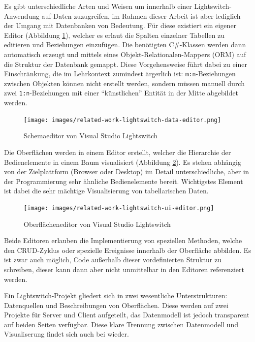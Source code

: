 Es gibt unterschiedliche Arten und Weisen um innerhalb einer Lightswitch-Anwendung auf Daten zuzugreifen, im Rahmen dieser Arbeit ist aber lediglich der Umgang mit Datenbanken von Bedeutung. Für diese existiert ein eigener Editor (Abbildung \ref{fig:lightswitch-data-designer}), welcher es erlaut die Spalten einzelner Tabellen zu editieren und Beziehungen einzufügen. Die benötigten C\#-Klassen werden dann automatisch erzeugt und mittels eines Objekt-Relationalen-Mappers (ORM) auf die Struktur der Datenbank gemappt. Diese Vorgehensweise führt dabei zu einer Einschränkung, die im Lehrkontext zumindest ärgerlich ist: \lstinline{m:n}-Beziehungen zwischen Objekten können nicht erstellt werden, sondern müssen manuell durch zwei \lstinline{1:n}-Beziehungen mit einer "`künstlichen"' Entität in der Mitte abgebildet werden.

\begin{figure}[h]
  \centering \texttt{[image: images/related-work-lightswitch-data-editor.png]}
  \caption{Schemaeditor von Visual Studio Lightswitch}
  \label{fig:lightswitch-data-designer}
\end{figure}

Die Oberflächen werden in einem Editor erstellt, welcher die Hierarchie der Bedienelemente in einem Baum visualisiert (Abbildung \ref{fig:lightswitch-ui-designer}). Es stehen abhängig von der Zielplattform (Browser oder Desktop) im Detail unterschiedliche, aber in der Programmierung sehr ähnliche Bedienelemente bereit. Wichtigstes Element ist dabei die sehr mächtige Visualisierung von tabellarischen Daten.

\begin{figure}[h]
  \centering \texttt{[image: images/related-work-lightswitch-ui-editor.png]}
  \caption{Oberflächeneditor von Visual Studio Lightswitch}
  \label{fig:lightswitch-ui-designer}
\end{figure}

Beide Editoren erlauben die Implementierung von speziellen Methoden, welche den CRUD-Zyklus oder spezielle Ereignisse innerhalb der Oberfläche abbilden. Es ist zwar auch möglich, Code außerhalb dieser vordefinierten Struktur zu schreiben, dieser kann dann aber nicht unmittelbar in den Editoren referenziert werden.

Ein Lightswitch-Projekt gliedert sich in zwei wesentliche Unterstrukturen: Datenquellen und Beschreibungen von Oberflächen. Diese werden auf zwei Projekte für Server und Client aufgeteilt, das Datenmodell ist jedoch transparent auf beiden Seiten verfügbar. Diese klare Trennung zwischen Datenmodell und Visualiserung findet sich auch bei \idename{} wieder.

